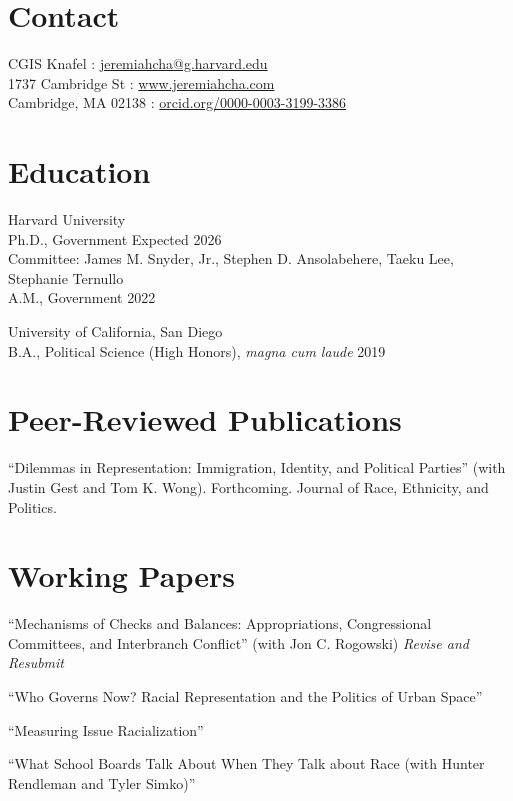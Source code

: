 \documentclass[margin, line]{res}
\begin{document}
\begin{resume}

\section{Contact}
CGIS Knafel \hfill \Letter: \href{mailto:jeremiahcha@g.harvard.edu}{jeremiahcha@g.harvard.edu}\\
1737 Cambridge St \hfill \Mundus: \href{httsp://www.jeremiahcha.com}{www.jeremiahcha.com}\\
Cambridge, MA 02138 \hfill \Mundus: \href{https://orcid.org/0000-0003-3199-3386}{orcid.org/0000-0003-3199-3386}

\section{Education}
Harvard University\\
\hspace*{5mm} Ph.D., Government \hfill Expected 2026\\
\hspace*{10mm} {\footnotesize Committee: James M. Snyder, Jr., Stephen D. Ansolabehere, Taeku Lee, Stephanie Ternullo}\\
\hspace*{5mm} A.M., Government \hfill 2022

University of California, San Diego\\
\hspace*{5mm} B.A., Political Science (High Honors), \textit{magna cum laude} \hfill 2019

\section{Peer-Reviewed Publications}
\begin{etaremune}
	\item ``Dilemmas in Representation: Immigration, Identity, and Political Parties'' (with Justin Gest and Tom K. Wong). Forthcoming. Journal of Race, Ethnicity, and Politics. 
\end{etaremune}



\section{Working Papers}
\begin{etaremune}
	\item ``Mechanisms of Checks and Balances: Appropriations, Congressional Committees, and Interbranch Conflict'' (with Jon C. Rogowski) \hfill \textit{Revise and Resubmit}
	\item ``Who Governs Now? Racial Representation and the Politics of Urban Space''
	\item ``Measuring Issue Racialization''
	\item ``What School Boards Talk About When They Talk about Race (with Hunter Rendleman and Tyler Simko)'' 
\end{etaremune}


\end{resume}
\end{document}
